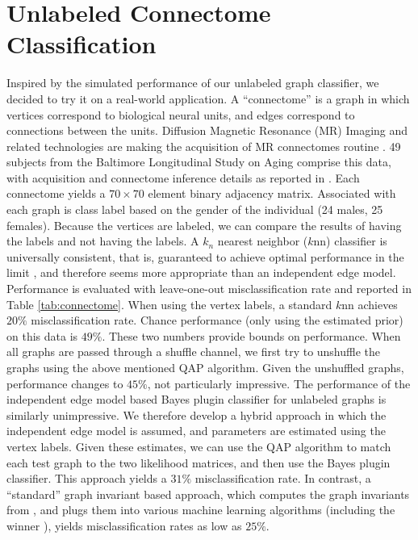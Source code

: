 \documentclass[10pt,journal,cspaper,compsoc]{IEEEtran}
\begin{document}
\section{Unlabeled Connectome Classification} %
\label{sub:connectome_classification}

Inspired by the simulated performance of our unlabeled graph classifier, we decided to try it on a real-world application.  A ``connectome'' is a graph in which vertices correspond to biological neural units, and edges correspond to connections between the units.  Diffusion Magnetic Resonance (MR) Imaging and related technologies are making the acquisition of MR connectomes routine \cite{Hagmann2010}.  49 subjects from the Baltimore Longitudinal Study on Aging comprise this data, with acquisition and connectome inference details as reported in \cite{Gray11}.  Each connectome yields a $70 \times 70$ element binary adjacency matrix.  Associated with each graph is class label based on the gender of the individual (24 males, 25 females).  Because the vertices are labeled, we can compare the results of having the labels and not having the labels.  A $k_n$ nearest neighbor ($k$nn) classifier is universally consistent, that is, guaranteed to achieve optimal performance in the limit \cite{Stone1977}, and therefore seems more appropriate than an independent edge model.  Performance is evaluated with leave-one-out misclassification rate and reported in Table \ref{tab:connectome}. When using the vertex labels, a standard $k$nn achieves $20\%$ misclassification rate.  Chance performance (only using the estimated prior) on this data is $49\%$.  These two numbers provide bounds on performance.  When all graphs are passed through a shuffle channel, we first try to unshuffle the graphs using the above mentioned QAP algorithm.  Given the unshuffled graphs, performance changes to $45\%$, not particularly impressive.  The performance of the independent edge model based Bayes plugin classifier for unlabeled graphs is similarly unimpressive.  We therefore develop a hybrid approach in which the independent edge model is assumed, and parameters are estimated using the vertex labels.  Given these estimates, we can use the QAP algorithm to match each test graph to the two likelihood matrices, and then use the Bayes plugin classifier.  This approach yields a $31\%$ misclassification rate. In contrast, a ``standard'' graph invariant based approach, which computes the graph invariants from \cite{PCP10}, and plugs them into various machine learning algorithms (including the winner \cite{Crammer2008}), yields misclassification rates as low as $25\%$. 
\end{document}
